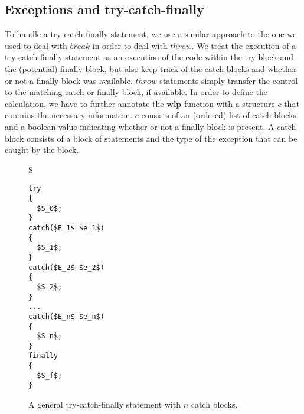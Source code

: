 \documentclass[a4paper, fleqn]{article}
\newcommand{\wlp}{\textbf{wlp}\xspace}
\begin{document}
\subsection{Exceptions and try-catch-finally}
To handle a try-catch-finally statement, we use a similar approach to the one we used to deal with $break$ in order to deal with $throw$. We treat the execution of a try-catch-finally statement as an execution of the code within the try-block and the (potential) finally-block, but also keep track of the catch-blocks and whether or not a finally block was available. $throw$ statements simply transfer the control to the matching catch or finally block, if available. In order to define the calculation, we have to further annotate the $\wlp$ function with a structure $c$ that contains the necessary information. $c$ consists of an (ordered) list of catch-blocks and a boolean value indicating whether or not a finally-block is present. A catch-block consists of a block of statements and the type of the exception that can be caught by the block. 
\\
\begin{wrapfigure}{r}{3cm}
S
\begin{lstlisting}
try
{
  $S_0$;
}
catch($E_1$ $e_1$)
{
  $S_1$;
}
catch($E_2$ $e_2$)
{
  $S_2$;
}
...
catch($E_n$ $e_n$)
{
  $S_n$;
}
finally
{
  $S_f$;
}
\end{lstlisting}
\caption{A general try-catch-finally statement with $n$ catch blocks.}
\label{try-catch-finally}
\end{wrapfigure}
\vspace{0.2cm}
\end{document}
